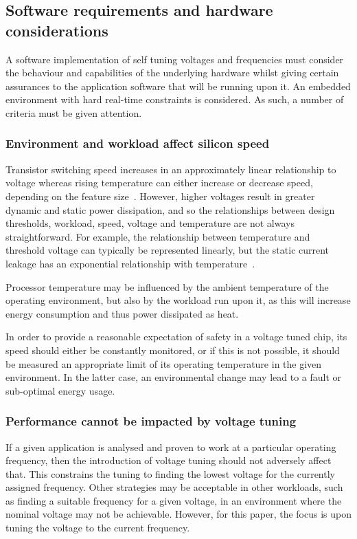 \documentclass[a4paper,twocolumn,DIV=16]{scrartcl}
\begin{document}
\subsection{Software requirements and hardware considerations}

A software implementation of self tuning voltages and frequencies must consider
the behaviour and capabilities of the underlying hardware whilst giving certain
assurances to the application software that will be running upon it. An embedded
environment with hard real-time constraints is considered. As such, a number of
criteria must be given attention.

\subsubsection*{Environment and workload affect silicon speed}

Transistor switching speed increases in an approximately linear relationship to
voltage whereas rising temperature can either increase or decrease speed,
depending on the feature size~\cite{cmosTempInversion}. However, higher voltages
result in greater dynamic and static power dissipation, and so the relationships
between design thresholds, workload, speed, voltage and temperature are not
always straightforward. For example, the relationship between temperature and
threshold voltage can typically be represented linearly, but the static current
leakage has an exponential relationship with temperature~\cite{Wolpert2012}.

Processor temperature may be influenced by the ambient temperature of the
operating environment, but also by the workload run upon it, as this will
increase energy consumption and thus power dissipated as heat.

In order to provide a reasonable expectation of safety in a voltage tuned chip,
its speed should either be constantly monitored, or if this is not possible, it
should be measured an appropriate limit of its operating temperature in the
given environment. In the latter case, an environmental change may lead to a
fault or sub-optimal energy usage.

\subsubsection*{Performance cannot be impacted by voltage tuning}

If a given application is analysed and proven to work at a particular operating
frequency, then the introduction of voltage tuning should not adversely affect
that. This constrains the tuning to finding the lowest voltage for the currently
assigned frequency. Other strategies may be acceptable in other workloads, such
as finding a suitable frequency for a given voltage, in an environment where the
nominal voltage may not be achievable. However, for this paper, the focus is
upon tuning the voltage to the current frequency.
\end{document}
